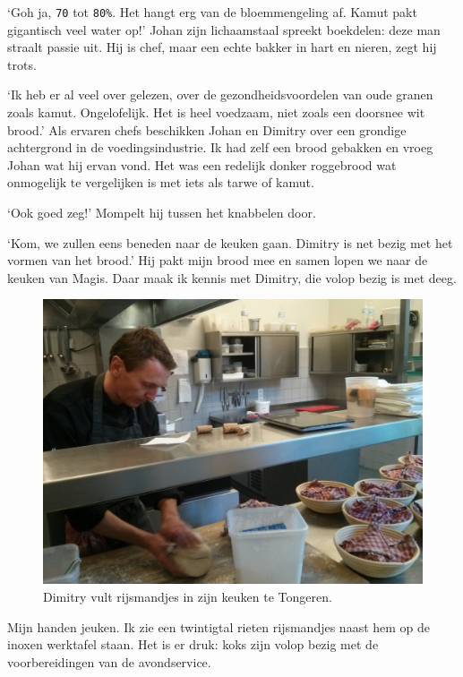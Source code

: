\documentclass[
  11pt,
  dutch,
]{memoir}
\begin{document}
`Goh ja, \texttt{70} tot \texttt{80\%}. Het hangt erg van de
bloemmengeling af. Kamut pakt gigantisch veel water op!' Johan zijn
lichaamstaal spreekt boekdelen: deze man straalt passie uit. Hij is
chef, maar een echte bakker in hart en nieren, zegt hij trots.

`Ik heb er al veel over gelezen, over de gezondheidsvoordelen van oude
granen zoals kamut. Ongelofelijk. Het is heel voedzaam, niet zoals een
doorsnee wit brood.' Als ervaren chefs beschikken Johan en Dimitry over
een grondige achtergrond in de voedingsindustrie. Ik had zelf een brood
gebakken en vroeg Johan wat hij ervan vond. Het was een redelijk donker
roggebrood wat onmogelijk te vergelijken is met iets als tarwe of kamut.

`Ook goed zeg!' Mompelt hij tussen het knabbelen door.

`Kom, we zullen eens beneden naar de keuken gaan. Dimitry is net bezig
met het vormen van het brood.' Hij pakt mijn brood mee en samen lopen we
naar de keuken van Magis. Daar maak ik kennis met Dimitry, die volop
bezig is met deeg.

\begin{figure}
    \centering
    \includegraphics{img/bw/magis.jpg}
    \caption[Dimitry in zijn keuken te Tongeren.]{Dimitry vult rijsmandjes in zijn keuken te Tongeren.}
\end{figure}

Mijn handen jeuken. Ik zie een twintigtal rieten rijsmandjes naast hem
op de inoxen werktafel staan. Het is er druk: koks zijn volop bezig met
de voorbereidingen van de avondservice.
\end{document}
